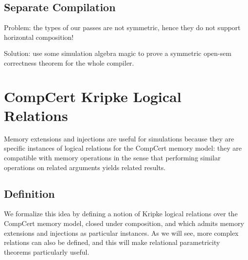 \documentclass[sigplan,10pt,review,anonymous]{acmart}
\begin{document}

\subsection{Separate Compilation} \label{sec:corr:sep} %

Problem:
the types of our passes are not symmetric,
hence they do not support horizontal composition!

Solution:
use some simulation algebra magic
to prove a symmetric open-sem correctness theorem
for the whole compiler.

\cbend


\section{CompCert Kripke Logical Relations} \label{sec:compcert:cklr} %

Memory extensions and injections
are useful for simulations
because they are specific instances
of logical relations for the CompCert memory model:
they are compatible with memory operations
in the sense that
performing similar operations on related arguments
yields related results.

\subsection{Definition} %

We formalize this idea by defining
a notion of Kripke logical relations over the CompCert memory model,
closed under composition, and which
admits memory extensions and injections as particular instances.
As we will see,
more complex relations can also be defined,
and this will make relational parametricity theorems
particularly useful.
\end{document}
